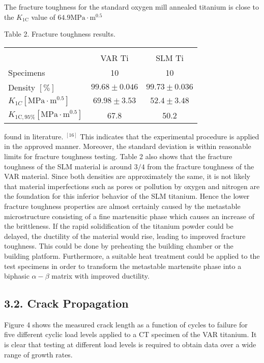 \documentclass[10pt]{article}
\begin{document}
The fracture toughness for the standard oxygen mill annealed titanium is close to the $K_{1 \mathrm{C}}$ value of $64.9 \mathrm{MPa} \cdot \mathrm{m}^{0.5}$

Table 2. Fracture toughness results.

\begin{center}
\begin{tabular}{lcc}
 &  &  \\
 & VAR Ti & SLM Ti \\
\hline
Specimens & 10 & 10 \\
Density $[\%]$ & $99.68 \pm 0.046$ & $99.73 \pm 0.036$ \\
$K_{1 C}\left[\mathrm{MPa} \cdot \mathrm{m}^{0.5}\right]$ & $69.98 \pm 3.53$ & $52.4 \pm 3.48$ \\
$K_{1 \mathrm{C}, 95 \%}\left[\mathrm{MPa} \cdot \mathrm{m}^{0.5}\right]$ & 67.8 & 50.2 \\
\end{tabular}
\end{center}

found in literature. ${ }^{[16]}$ This indicates that the experimental procedure is applied in the approved manner. Moreover, the standard deviation is within reasonable limits for fracture toughness testing. Table 2 also shows that the fracture toughness of the SLM material is around $3 / 4$ from the fracture toughness of the VAR material. Since both densities are approximately the same, it is not likely that material imperfections such as pores or pollution by oxygen and nitrogen are the foundation for this inferior behavior of the SLM titanium. Hence the lower fracture toughness properties are almost certainly caused by the metastable microstructure consisting of a fine martensitic phase which causes an increase of the brittleness. If the rapid solidification of the titanium powder could be delayed, the ductility of the material would rise, leading to improved fracture toughness. This could be done by preheating the building chamber or the building platform. Furthermore, a suitable heat treatment could be applied to the test specimens in order to transform the metastable martensite phase into a biphasic $\alpha-\beta$ matrix with improved ductility.

\subsection*{3.2. Crack Propagation}
Figure 4 shows the measured crack length as a function of cycles to failure for five different cyclic load levels applied to a CT specimen of the VAR titanium. It is clear that testing at different load levels is required to obtain data over a wide range of growth rates.
\end{document}
